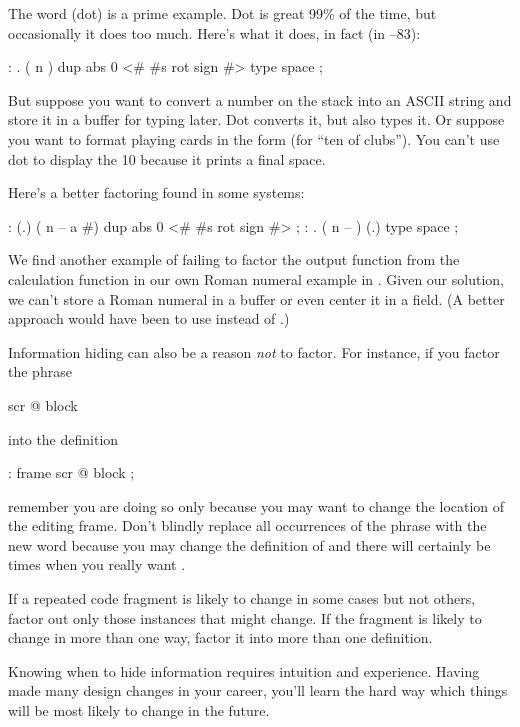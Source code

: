 The word  (dot) is a prime example. Dot is great 99\% of the
time, but occasionally it does too much. Here's what it does, in fact
(in \Forth{}--83):

\begin{Code}
: .   ( n )  dup abs 0 <# #s  rot sign  #> type space ;
\end{Code}
But suppose you want to convert a number on the stack into an ASCII
string and store it in a buffer for typing later. Dot converts it, but
also types it. Or suppose you want to format playing cards in the form
 (for ``ten of clubs''). You can't use dot to display the 10
because it prints a final space.

Here's a better factoring found in some \Forth{} systems:

\begin{Code}
: (.)  ( n -- a #)  dup abs 0  <# #s  rot sign  #> ;
: .  ( n -- )  (.) type space ;
\end{Code}
We find another example of failing to factor the output function from
the calculation function in our own Roman numeral example in .
Given our solution, we can't store a Roman numeral in a buffer or
even center it in a field. (A better approach would have been to use
 instead of .)

Information hiding can also be a reason \emph{not} to factor. For
instance, if you factor the phrase

\begin{Code}
scr @ block
\end{Code}
into the definition

\begin{Code}
: frame   scr @ block ;
\end{Code}
remember you are doing so only because you may want to change the location
of the editing frame. Don't blindly replace all occurrences of the phrase
with the new word  because you may change the definition of
 and there will certainly be times when you really want
.

\begin{tip}
If a repeated code fragment is likely to change in some cases but not
others, factor out only those instances that might change. If the
fragment is likely to change in more than one way, factor it into more
than one definition.
\end{tip}
Knowing when to hide information requires intuition and experience.
Having made many design changes in your career, you'll learn the hard
way which things will be most likely to change in the future.

